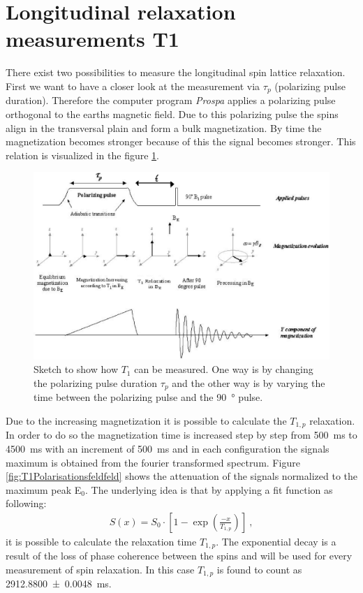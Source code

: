 \section{Longitudinal relaxation measurements T1}
\label{sec:LongitudinalrelaxationmeasurementsT1}
There exist two possibilities to measure the longitudinal spin lattice relaxation.
First we want to have a closer look at the measurement via $\tau_p$ (polarizing pulse duration).
Therefore the computer program \textit{Prospa} applies a polarizing pulse orthogonal to the earths magnetic field.
Due to this polarizing pulse the spins align in the transversal plain and form a bulk magnetization.
By time the magnetization becomes stronger because of this the signal becomes stronger.
This relation is visualized in the figure \ref{fig:BildT1}.

\begin{figure}[H]
    \centering
    \includegraphics[width= \textwidth]{Abbildungen/BildT1.png}   
    \caption[Sketch to show how $T_1$ can be measured. \cite{Bild}]{Sketch to show how $T_1$ can be measured.
    One way is by changing the polarizing pulse duration $\tau_p$ and the other way is by varying the time between the polarizing pulse and the \SI{90}{\degree} pulse. \cite{Bild}}
    \label{fig:BildT1}
\end{figure}

Due to the increasing magnetization it is possible to calculate the $T_{1,p}$ relaxation.
In order to do so the magnetization time is increased step by step from \SI{500}{\milli \second} to \SI{4500}{\milli \second} with an increment of \SI{500}{\milli \second} and in each configuration the signals maximum is obtained from the fourier transformed spectrum.
Figure \ref{fig:T1Polarisationsfeldfeld} shows the attenuation of the signals normalized to the maximum peak E$_0$.
The underlying idea is that by applying a fit function as following:
\begin{align}
    S(x)=S_0 \cdot \left[1-\exp\left(\frac{-x}{T_{1,p}}\right)\right] \ ,
    \label{eq: fitBp}
\end{align}
it is possible to calculate the relaxation time $T_{1,p}$.
The exponential decay is a result of the loss of phase coherence between the spins and will be used for every measurement of spin relaxation.
In this case $T_{1,p}$ is found to count as \SI{2912.8800 \pm 0.0048}{\milli \second}.

